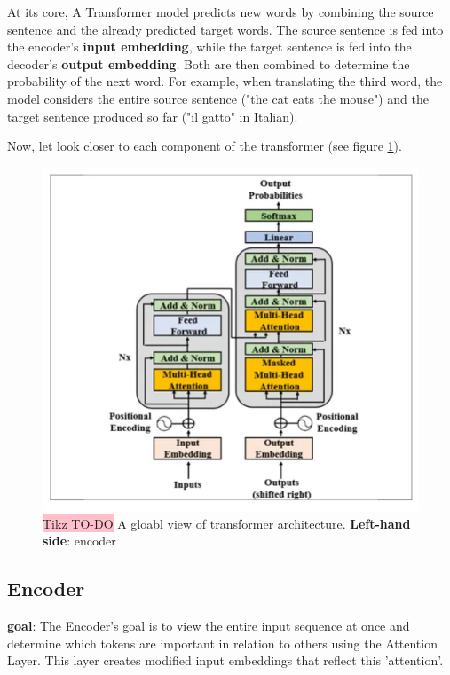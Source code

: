 At its core, A Transformer model predicts new words by combining the source sentence and the already predicted target words. The source sentence is fed into the encoder's \textbf{input embedding}, while the target sentence is fed into the decoder's \textbf{output embedding}. Both are then combined to determine the probability of the next word. For example, when translating the third word, the model considers the entire source sentence ("the cat eats the mouse") and the target sentence produced so far ("il gatto" in Italian). 

Now, let look closer to each component of the transformer (see figure \ref{fig:transformer}).


\begin{figure}[!htbp]
    \centering
    \includegraphics[width=\linewidth]{tikz/transformer.jpg}
    \caption{{\color{red}\colorbox{pink}{Tikz TO-DO}} A gloabl view of transformer architecture. \textbf{Left-hand side}: encoder}
    \label{fig:transformer}
\end{figure}

\subsection{Encoder}


\textbf{goal}: The Encoder's goal is to view the entire input sequence at once and determine which tokens are important in relation to others using the Attention Layer. This layer creates modified input embeddings that reflect this 'attention'.




